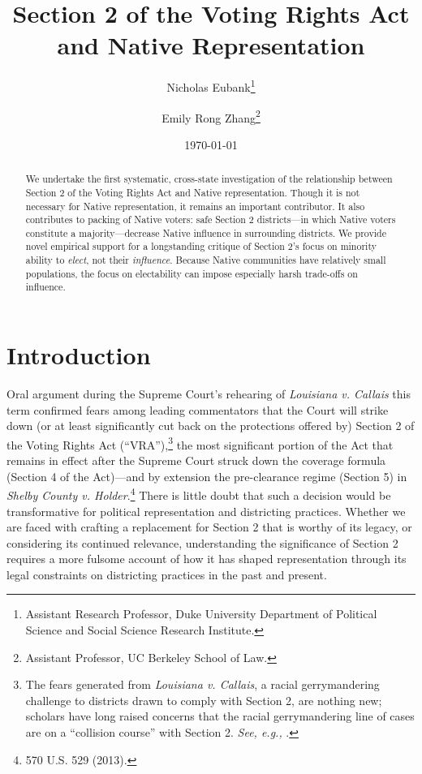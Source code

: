 \documentclass[12pt]{article}
\title{Section 2 of the Voting Rights Act and Native Representation}
\author{
    Nicholas Eubank\thanks{Assistant Research Professor, Duke University Department of Political Science and Social Science Research Institute.} \and
    Emily Rong Zhang\thanks{Assistant Professor, UC Berkeley School of Law.}
}
\date{\today} %
\begin{document}
\maketitle
\onehalfspacing

\begin{abstract}
\bigskip \singlespacing
\noindent 
We undertake the first systematic, cross-state investigation of the relationship between Section 2 of the Voting Rights Act and Native representation.  Though it is not necessary for Native representation, it remains an important contributor.  It also contributes to packing of Native voters: safe Section 2 districts---in which Native voters constitute a majority---decrease Native influence in surrounding districts. We provide novel empirical support for a longstanding critique of Section 2's focus on minority ability to \textit{elect}, not their \textit{influence}. Because Native communities have relatively small populations, the focus on electability can impose especially harsh trade-offs on influence. 

\end{abstract}

\newpage \clearpage


\section*{Introduction}

Oral argument during the Supreme Court's rehearing of \textit{Louisiana v. Callais} this term confirmed fears among leading commentators that the Court will strike down (or at least significantly cut back on the protections offered by) Section 2 of the Voting Rights Act (``VRA''),\footnote{The fears generated from \textit{Louisiana v. Callais}, a racial gerrymandering challenge to districts drawn to comply with Section 2, are nothing new; scholars have long raised concerns that the racial gerrymandering line of cases are on a ``collision course'' with Section 2. \textit{See, e.g.,} \cite{charles2017race}.} the most significant portion of the Act that remains in effect after the Supreme Court struck down the coverage formula (Section 4 of the Act)---and by extension the pre-clearance regime (Section 5) in \textit{Shelby County v. Holder}.\footnote{570 U.S. 529 (2013).} There is little doubt that such a decision would be transformative for political representation and districting practices.  Whether we are faced with crafting a replacement for Section 2 that is worthy of its legacy, or considering its continued relevance, understanding the significance of Section 2 requires a more fulsome account of how it has shaped representation through its legal constraints on districting practices in the past and present.
\end{document}
